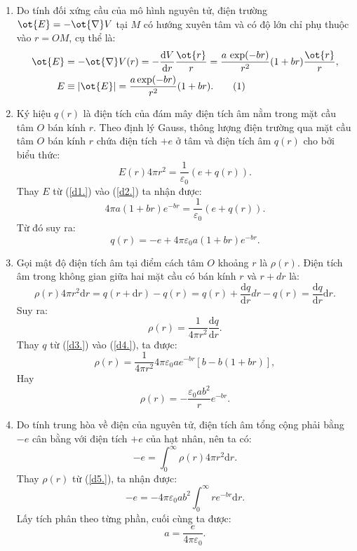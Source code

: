 \begin{loigiai}

\begin{enumerate}[1)] 
       \item Do tính đối xứng cầu của mô hình nguyên tử, điện trường $\ot{E}=-\ot{\nabla} V$  tại $M$ có hướng xuyên tâm và có độ lớn chỉ phụ thuộc vào $r=OM$, cụ thể là:
	\begin{align*}
	    \ot{E}&=-\ot{\nabla }V(r)=-\dfrac{\mathrm{d}V}{\mathrm{d}r}\dfrac{{\ot{r}}}{r}=\dfrac{a\,\exp (-br)}{{{r}^{2}}}(1+br)\dfrac{{\ot{r}}}{r},\\
		E&\equiv \left| {\ot{E}} \right|=\dfrac{a\exp (-br)}{{{r}^{2}}}(1+br). \tag{1} \label{d1.}	
	\end{align*}
			 
\item Ký hiệu $q(r)$ là điện tích của đám mây điện tích âm nằm trong mặt cầu tâm $O$ bán kính $r$. Theo định lý Gauss, thông lượng điện trường qua mặt cầu tâm $O$ bán kính $r$ chứa điện tích $+e$ ở tâm và điện tích âm $q(r)$ cho bởi biểu thức:
	\[E(r)4\pi {{r}^{2}}=\dfrac{1}{{{\varepsilon }_{0}}}(e+q(r)) \tag{2} \label{d2.}.\]				          
Thay $E$ từ (\ref{d1.}) vào (\ref{d2.}) ta nhận được:
	\[4\pi a(1+br){{e}^{-br}}=\dfrac{1}{{{\varepsilon }_{0}}}(e+q(r)).\]
Từ đó suy ra: \[q(r)=-e+4\pi {{\varepsilon }_{0}}a(1+br){{e}^{-br}} \tag{3} \label{d3.}.\]		                     
\item Gọi mật độ điện tích âm tại điểm cách tâm $O$ khoảng $r$ là $\rho(r)$. Điện tích âm trong không gian giữa hai mặt cầu có bán kính $r$ và $r+dr$ là:
	\[\rho (r)4\pi {{r}^{2}}\mathrm{d}r=q(r+\mathrm{d}r)-q(r)=q(r)+\dfrac{\mathrm{d}q}{\mathrm{d}r}dr-q(r)=\dfrac{\mathrm{d}q}{\mathrm{d}r}\mathrm{d}r.\]
Suy ra: 	\[\rho (r)=\dfrac{1}{4\pi {{r}^{2}}}\dfrac{\mathrm{d}q}{\mathrm{d}r} \tag{4} \label{d4.}.\]				                 
Thay $q$ từ (\ref{d3.}) vào (\ref{d4.}), ta được:
	\[\rho (r)=\dfrac{1}{4\pi {{r}^{2}}}4\pi {{\varepsilon }_{0}}a{{e}^{-br}}\left[ b-b(1+br) \right],\]
Hay 	\[\rho (r)=-\dfrac{{{\varepsilon }_{0}}a{{b}^{2}}}{r}{{e}^{-br}} \tag{5} \label{d5.}.\]					     
\item Do tính trung hòa về điện của nguyên tử, điện tích âm tổng cộng phải bằng $-e$ cân bằng với điện tích $+e$ của hạt nhân, nên ta có:
		\[-e=\int_{0}^{\infty }{\rho (r)4\pi {{r}^{2}}\mathrm{d}r}.\]
Thay $\rho(r)$ từ (\ref{d5.}), ta nhận được:
	\[-e=-4\pi {{\varepsilon }_{0}}a{{b}^{2}}\int_{0}^{\infty }{r{{e}^{-br}}{\mathrm{d}}r}.\]
Lấy tích phân theo từng phần, cuối cùng ta được: \[a=\dfrac{e}{4\pi {{\varepsilon }_{0}}} \tag{6} \label{d6.}.\]

\end{enumerate}
\end{loigiai}
